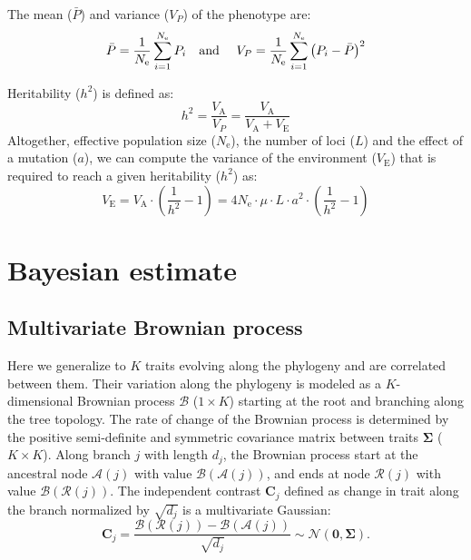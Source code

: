 \documentclass{article}
\newcommand{\Multiply}{\cdot}
\newcommand{\UniDimArray}[1]{\bm{#1}}
\newcommand{\BiDimArray}[1]{\bm{#1}}
\newcommand{\Ne}{N_{\text{e}}}
\newcommand{\Trait}{P}
\newcommand{\Heritability}{h^2}
\newcommand{\VecZero}{\UniDimArray{0}}
\newcommand{\MutationRatePheno}{\mu}
\newcommand{\NbrLoci}{L}
\newcommand{\VarPhenotype}{V_{\Trait}}
\newcommand{\VarGenetic}{V_{\mathrm{A}}}
\newcommand{\VarEnv}{V_{\mathrm{E}}}
\newcommand{\Ntrait}{K}
\newcommand{\contrast}{\UniDimArray{C}}
\newcommand{\Covariancematrix}{\Sigma}
\newcommand{\CovarianceMatrix}{\BiDimArray{\Covariancematrix}}
\newcommand{\brownian}{\mathcal{B}}
\newcommand{\Brownian}{\UniDimArray{\brownian}}
\begin{document}
The mean ($\bar{\Trait}$) and variance ($\VarPhenotype$) of the phenotype are:
\begin{equation}
    \bar{\Trait} = \frac{1}{\Ne}\sum_{i=1}^{\Ne} \Trait_i \text{\quad and \quad} \VarPhenotype = \frac{1}{\Ne}\sum_{i=1}^{\Ne}\left(\Trait_i - \bar{\Trait} \right)^2 \label{eq:simu-between}
\end{equation}

Heritability ($\Heritability$) is defined as:
\begin{equation}
    \Heritability = \frac{\VarGenetic}{\VarPhenotype} = \frac{\VarGenetic}{\VarGenetic + \VarEnv}\label{eq:simu-heritability}
\end{equation}
Altogether, effective population size ($\Ne$), the number of loci ($\NbrLoci$) and the effect of a mutation ($a$), we can compute the variance of the environment ($\VarEnv$) that is required to reach a given heritability ($\Heritability$) as:
\begin{equation}
    \VarEnv = \VarGenetic \Multiply \left( \frac{1}{\Heritability} - 1 \right) = 4 \Ne \Multiply \MutationRatePheno \Multiply \NbrLoci \Multiply a^2 \Multiply \left( \frac{1}{\Heritability} - 1 \right) \label{eq:simu-var-env}
\end{equation}

\newpage
\section{Bayesian estimate}\label{sec:bayesian-estimate}

\subsection{Multivariate Brownian process}\label{subsec:multivariate-brownian-process}
Here we generalize to $\Ntrait$ traits evolving along the phylogeny and are correlated between them.
Their variation along the phylogeny is modeled as a $\Ntrait$-dimensional Brownian process $\Brownian$ ($1 \times \Ntrait$) starting at the root and branching along the tree topology.
The rate of change of the Brownian process is determined by the positive semi-definite and symmetric covariance matrix between traits $\CovarianceMatrix$ ($\Ntrait \times \Ntrait$).
Along branch $j$ with length $d_{j}$, the Brownian process start at the ancestral node $\mathcal{A}(j)$ with value $\Brownian(\mathcal{A}(j))$, and ends at node $\mathcal{R}(j)$  with value $\Brownian(\mathcal{R}(j))$.
The independent contrast $\contrast_{j}$ defined as change in trait along the branch normalized by $\sqrt {d_{j}}$ is a multivariate Gaussian:
\begin{equation}
    \label{eq:DistribBrownian}
    \contrast_{j} = \frac{\Brownian (\mathcal{R}(j)) - \Brownian (\mathcal{A}(j)) }{\sqrt {d_{j}}} \sim \mathcal{N}\left(\VecZero, \CovarianceMatrix \right).
\end{equation}
\end{document}
